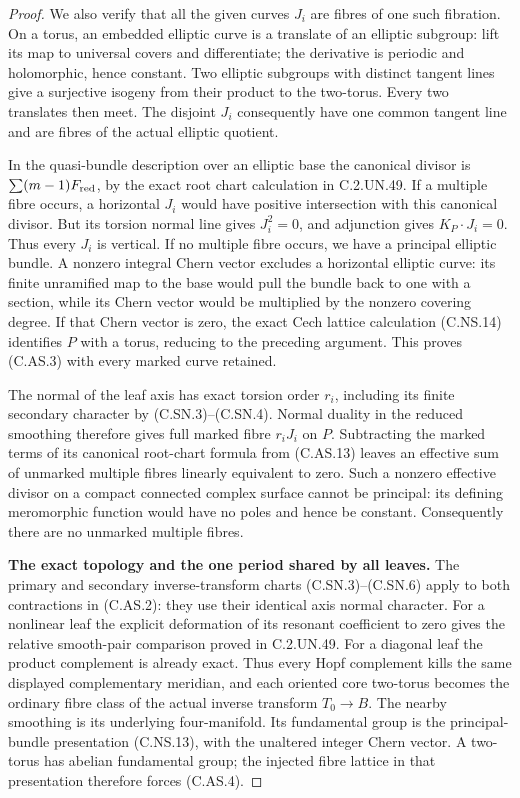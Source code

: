 \begin{proof}
We also verify that all the given curves
$J_i$ are fibres of one such fibration.
On a torus, an embedded elliptic curve is a
translate of an elliptic subgroup: lift its
map to universal covers and differentiate;
the derivative is periodic and holomorphic,
hence constant. Two elliptic subgroups with
distinct tangent lines give a surjective
isogeny from their product to the two-torus.
Every two translates then meet. The disjoint
$J_i$ consequently have one common tangent
line and are fibres of the actual elliptic
quotient.

In the quasi-bundle description over an
elliptic base the canonical divisor is
$\sum(m-1)F_{\rm red}$, by the exact root
chart calculation in C.2.UN.49.
If a multiple fibre occurs, a horizontal
$J_i$ would have positive intersection with
this canonical divisor. But its torsion
normal line gives $J_i^2=0$, and adjunction
gives $K_P\cdot J_i=0$. Thus every $J_i$
is vertical. If no multiple fibre occurs,
we have a principal elliptic bundle.
A nonzero integral Chern vector excludes
a horizontal elliptic curve: its finite
unramified map to the base would pull the
bundle back to one with a section, while
its Chern vector would be multiplied by
the nonzero covering degree. If that Chern
vector is zero, the exact Cech lattice
calculation (C.NS.14) identifies $P$ with
a torus, reducing to the preceding argument.
This proves (C.AS.3) with every marked
curve retained.

The normal of the leaf axis has exact
torsion order $r_i$, including its finite
secondary character by (C.SN.3)--(C.SN.4).
Normal duality in the reduced smoothing
therefore gives full marked fibre $r_iJ_i$
on $P$. Subtracting the marked terms of
its canonical root-chart formula from
(C.AS.13) leaves an effective sum of
unmarked multiple fibres linearly
equivalent to zero. Such a nonzero
effective divisor on a compact connected
complex surface cannot be principal:
its defining meromorphic function would
have no poles and hence be constant.
Consequently there are no unmarked
multiple fibres.

\par\medskip\noindent\textbf{The exact topology and the one period shared by all leaves.}
The primary and secondary inverse-transform
charts (C.SN.3)--(C.SN.6) apply to both
contractions in (C.AS.2): they use their
identical axis normal character. For a
nonlinear leaf the explicit deformation
of its resonant coefficient to zero gives
the relative smooth-pair comparison
proved in C.2.UN.49. For a diagonal leaf
the product complement is already exact.
Thus every Hopf complement kills the
same displayed complementary meridian,
and each oriented core two-torus becomes
the ordinary fibre class of the actual
inverse transform $T_0\to B$.
The nearby smoothing is its underlying
four-manifold. Its fundamental group is
the principal-bundle presentation
(C.NS.13), with the unaltered integer
Chern vector. A two-torus has abelian
fundamental group; the injected fibre
lattice in that presentation therefore
forces (C.AS.4).


\end{proof}
